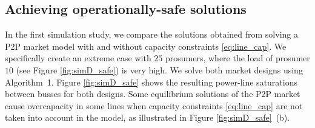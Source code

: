 \documentclass{IEEEtran}  %
\newcommand{\0}{\mathbf{0}}
\newcommand{\1}{\mathbf{1}}
\begin{document}
\subsection{Achieving operationally-safe solutions}
In the first simulation study, we compare the solutions obtained from solving a P2P market model with and without capacity constraints \eqref{eq:line_cap}. We specifically create an extreme case with $25$ prosumers, where the load of  prosumer $10$ (see Figure \ref{fig:simD_safe}) is very high. We solve both market designs using Algorithm~1. Figure \ref{fig:simD_safe} shows the resulting power-line saturations between busses for both designs. 
%
Some equilibrium solutions of the P2P market cause overcapacity in some lines when capacity constraints \eqref{eq:line_cap} are not taken into account in the model, as illustrated in Figure \ref{fig:simD_safe}~(b).
\end{document}
